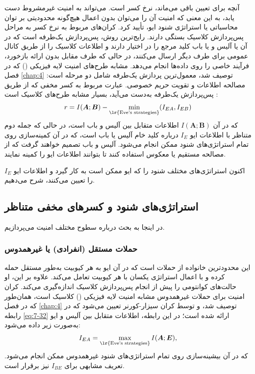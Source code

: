 آنچه برای تعیین باقی می‌ماند، نرخ کسر است.  می‌تواند به امنیت غیرمشروط دست یابد، به این معنی که امنیت آن را می‌توان بدون اعمال هیچ‌گونه محدودیتی بر توان محاسباتی یا استراتژی شنود ایو، تأیید کرد. کران‌های مربوط به نرخ کسر به مراحل پس‌پردازش کلاسیک بستگی دارند. رایج‌ترین روش، پس‌پردازش یک‌طرفه است که در آن یا آلیس و یا باب کلید مرجع را در اختیار دارند و اطلاعات کلاسیک را از طریق کانال عمومی برای طرف دیگر ارسال می‌کنند، در حالی که طرف مقابل بدون ارائه بازخورد، فرآیند خاصی را روی داده‌ها انجام می‌دهد. مشابه طرح‌های امنیت لایه فیزیکی () که در فصل \ref{chap:4} توصیف شد، معمول‌ترین پردازش یک‌طرفه شامل دو مرحله است: مصالحه اطلاعات و تقویت حریم خصوصی. عبارت مربوط به کسر مخفی که از طریق پس‌پردازش یک‌طرفه به‌دست می‌آید، بسیار مشابه طرح‌های  کلاسیک است \cite{7-46}:
\begin{equation}
	r = I(\bm{A}; \bm{B}) - \min_{\text{\lr{Eve's strategies}}} (I_{EA}, I_{EB})
	\label{eq:7-32}
\end{equation}
که در آن $I(\bm{A}; \bm{B})$ اطلاعات متقابل بین آلیس و باب است، در حالی که جمله دوم متناظر با اطلاعات ایو $I_E$ درباره کلید خام آلیس یا باب است، که در آن کمینه‌سازی روی تمام استراتژی‌های شنود ممکن انجام می‌شود. آلیس و باب تصمیم خواهند گرفت که از مصالحه مستقیم یا معکوس استفاده کنند تا بتوانند اطلاعات ایو را کمینه نمایند.

اکنون استراتژی‌های مختلف شنود را که ایو ممکن است به کار گیرد و اطلاعات ایو $I_E$ را تعیین می‌کنند، شرح می‌دهیم.









\subsection{استراتژی‌های شنود و کسرهای مخفی متناظر}
\label{sec:7-4-1}
در اینجا به بحث درباره سطوح مختلف امنیت می‌پردازیم.

\subsubsection{حملات مستقل (انفرادی) یا غیرهمدوس}
\label{subsec:7-4-1-1}
این محدودترین خانواده از حملات است که در آن ایو به هر کیوبیت به‌طور مستقل حمله کرده و با اعمال استراتژی یکسان با هر کیوبیت تعامل می‌کند. علاوه بر این، او حالت‌های کوانتومی را پیش از انجام پس‌پردازش کلاسیک اندازه‌گیری می‌کند. کران امنیت برای حملات غیرهمدوس مشابه امنیت لایه فیزیکی () کلاسیک است، همان‌طور که در فصل \ref{chap:4} توصیف شد، و توسط کران سیزار-کورنر \cite{7-48} تعیین می‌شود که در رابطه \eqref{eq:7-32} ارائه شده است؛ در این رابطه، اطلاعات متقابل بین آلیس و ایو به‌صورت زیر داده می‌شود:
\begin{equation}
	I_{EA} = \max_{\text{\lr{Eve's strategies}}} I(\bm{A}; \bm{E}),
	\label{eq:7-33}
\end{equation}
که در آن بیشینه‌سازی روی تمام استراتژی‌های شنود غیرهمدوس ممکن انجام می‌شود. تعریف مشابهی برای $I_{BE}$ نیز برقرار است.

